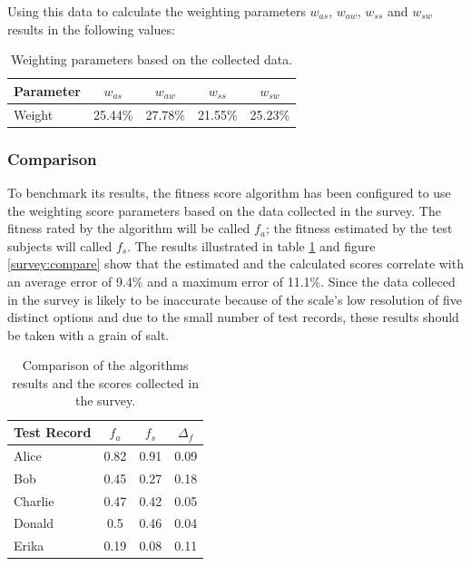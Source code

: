 Using this data to calculate the weighting parameters $w_{as}$, $w_{aw}$, $w_{ss}$ and $w_{sw}$ results in the following values:
\begin{table}[H]
\centering
\begin{tabular}{l||c|c|c|c}
Parameter & $w_{as}$ & $w_{aw}$ & $w_{ss}$ & $w_{sw}$\\
\hline
Weight & 25.44\% & 27.78\% & 21.55\% & 25.23\% \\
\end{tabular}
\caption[Survey: Resulting Weighting Parameters]{Weighting parameters based on the collected data.}
\end{table}

\subsubsection{Comparison}
To benchmark its results, the fitness score algorithm has been configured to use the weighting score parameters based on the data collected in the survey.
The fitness rated by the algorithm will be called $f_a$; the fitness estimated by the test subjects will called $f_s$.
The results illustrated in table \ref{tab:survey_raw} and figure \ref{survey:compare} show that the estimated and the calculated scores correlate with an average error of 9.4\% and a maximum error of 11.1\%. Since the data colleced in the survey is likely to be inaccurate because of the scale's low resolution of five distinct options and due to the small number of test records, these results should be taken with a grain of salt.

\begin{table}[H]
\centering
\begin{tabular}{l||c|c|c}
Test Record & $f_a$ & $f_s$ & $\Delta_{f}$ \\
\hline
Alice       & 0.82 & 0.91 & 0.09\\
Bob         & 0.45 & 0.27 & 0.18\\
Charlie     & 0.47 & 0.42 & 0.05\\
Donald      & 0.5  & 0.46 & 0.04\\
Erika       & 0.19 & 0.08 & 0.11\\
\end{tabular}
\caption[Survey: Comparison of Algorithm and Survey]{Comparison of the algorithms results and the scores collected in the survey.}
\label{tab:survey_raw}
\end{table}

